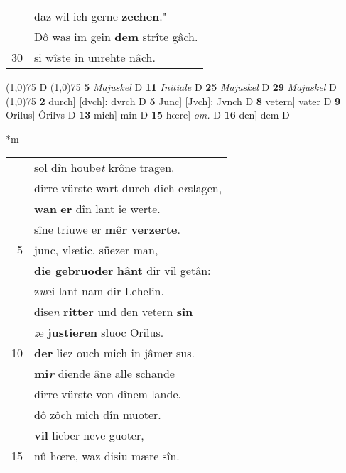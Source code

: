 \documentclass[8pt,a4paper,notitlepage]{article}
\begin{document}
\begin{table}[ht]
\begin{minipage}[t]{0.5\linewidth}
\begin{tabular}{rl}
 & daz wil ich gerne \textbf{zechen}."\\ 
 & Dô was im gein \textbf{dem} strîte gâch.\\ 
30 & si wîste in unrehte nâch.\\ 
\end{tabular}
\scriptsize
\line(1,0){75} \newline
D \newline
\line(1,0){75} \newline
\textbf{5} \textit{Majuskel} D  \textbf{11} \textit{Initiale} D  \textbf{25} \textit{Majuskel} D  \textbf{29} \textit{Majuskel} D  \newline
\line(1,0){75} \newline
\textbf{2} durch] [dvch]: dvrch D \textbf{5} Junc] [Jvch]: Jvnch D \textbf{8} vetern] vater D \textbf{9} Orilus] Ôrilvs D \textbf{13} mich] min D \textbf{15} hœre] \textit{om.} D \textbf{16} den] dem D \newline
\end{minipage}
\hspace{0.5cm}
\begin{minipage}[t]{0.5\linewidth}
\small
\begin{center}*m
\end{center}
\begin{tabular}{rl}
 & sol dîn hoube\textit{t} krône tragen.\\ 
 & dirre vürste wart durch dich e\textit{r}slagen,\\ 
 & \textbf{wan} \textbf{er} dîn lant ie werte.\\ 
 & sîne triuwe er \textbf{mêr} \textbf{verzerte}.\\ 
5 & junc, vlætic, süezer man,\\ 
 & \textbf{die gebruoder} \textbf{hânt} dir vil getân:\\ 
 & z\textit{w}ei lant nam dir Lehelin.\\ 
 & dise\textit{n} \textbf{ritter} und den vetern \textbf{sîn}\\ 
 & \textit{z}e \textbf{justieren} sluoc Orilus.\\ 
10 & \textbf{der} liez ouch mich in jâmer sus.\\ 
 & \textbf{mi\textit{r}} diende âne alle schande\\ 
 & dirre vürste von dînem lande.\\ 
 & dô zôch mich dîn muoter.\\ 
 & \textbf{vil} lieber neve guoter,\\ 
15 & nû hœre, waz disiu mære sîn.\\ 

\end{tabular}
\end{minipage}
\end{table}
\end{document}
